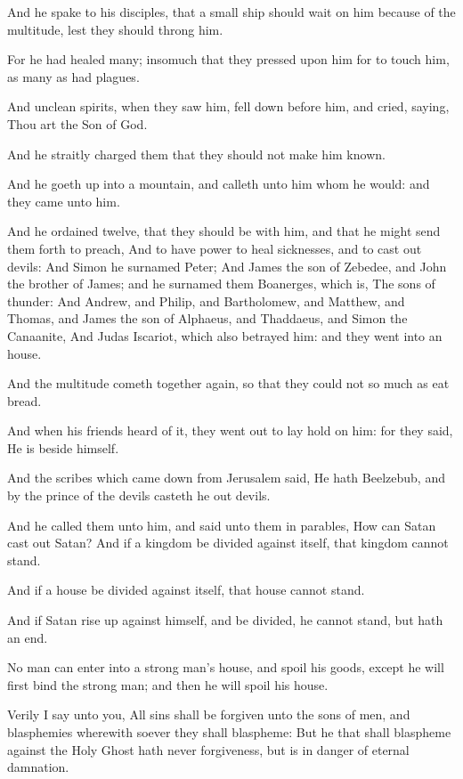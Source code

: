 \verse And he spake to his disciples, that a small ship should wait on him because of the multitude, lest they should throng him.

\verse For he had healed many; insomuch that they pressed upon him for to touch him, as many as had plagues.

\verse And unclean spirits, when they saw him, fell down before him, and cried, saying, Thou art the Son of God.

\verse And he straitly charged them that they should not make him known.

\verse And he goeth up into a mountain, and calleth unto him whom he would: and they came unto him.

\verse And he ordained twelve, that they should be with him, and that he might send them forth to preach, \verse And to have power to heal sicknesses, and to cast out devils: \verse And Simon he surnamed Peter; \verse And James the son of Zebedee, and John the brother of James; and he surnamed them Boanerges, which is, The sons of thunder: \verse And Andrew, and Philip, and Bartholomew, and Matthew, and Thomas, and James the son of Alphaeus, and Thaddaeus, and Simon the Canaanite, \verse And Judas Iscariot, which also betrayed him: and they went into an house.

\verse And the multitude cometh together again, so that they could not so much as eat bread.

\verse And when his friends heard of it, they went out to lay hold on him: for they said, He is beside himself.

\verse And the scribes which came down from Jerusalem said, He hath Beelzebub, and by the prince of the devils casteth he out devils.

\verse And he called them unto him, and said unto them in parables, How can Satan cast out Satan?  \verse And if a kingdom be divided against itself, that kingdom cannot stand.

\verse And if a house be divided against itself, that house cannot stand.

\verse And if Satan rise up against himself, and be divided, he cannot stand, but hath an end.

\verse No man can enter into a strong man's house, and spoil his goods, except he will first bind the strong man; and then he will spoil his house.

\verse Verily I say unto you, All sins shall be forgiven unto the sons of men, and blasphemies wherewith soever they shall blaspheme: \verse But he that shall blaspheme against the Holy Ghost hath never forgiveness, but is in danger of eternal damnation.

